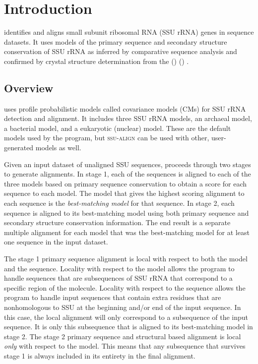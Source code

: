 \section{Introduction}

 identifies and aligns small subunit ribosomal RNA
(SSU rRNA) genes in sequence datasets. It uses models of the primary
sequence and secondary structure conservation of SSU rRNA as inferred
by comparative sequence analysis and confirmed by crystal structure
determination from the  () 
()
\cite{CannoneGutell02}.

\subsection{Overview}
 uses profile probabilistic models called
covariance models (CMs) for SSU rRNA detection and alignment. It
includes three SSU rRNA models, an archaeal model, a bacterial model,
and a eukaryotic (nuclear) model.  These are the default models used
by the program, but \textsc{ssu-align} can be used with other,
user-generated models as well.

Given an input dataset of unaligned SSU sequences,
 proceeds through two stages to generate
alignments. In stage 1, each of the sequences is aligned to
each of the three models based on primary sequence conservation to
obtain a score for each sequence to each model.  The model that gives
the highest scoring alignment to each sequence is the
\emph{best-matching model} for that sequence.  In stage 2, each
sequence is aligned to its best-matching model using both primary
sequence and secondary structure conservation information. The end result is a
separate multiple alignment for each model that was the best-matching
model for at least one sequence in the input dataset.

The stage 1 primary sequence alignment is local with respect to both
the model and the sequence. Locality with respect to the model allows
the program to handle sequences that are subsequences of SSU
rRNA that correspond to a specific region of the molecule. Locality
with respect to the sequence allows the program to handle input
sequences that contain extra residues that are nonhomologous to SSU at
the beginning and/or end of the input sequence. In this case, the
local alignment will only correspond to a subsequence of the input
sequence. It is only this subsequence that is aligned to its
best-matching model in stage 2.
The stage 2 primary sequence and structural based alignment is local
\emph{only} with respect to the model.  This means that any subsequence
that survives stage 1 is always included in its entirety in the final
alignment.

